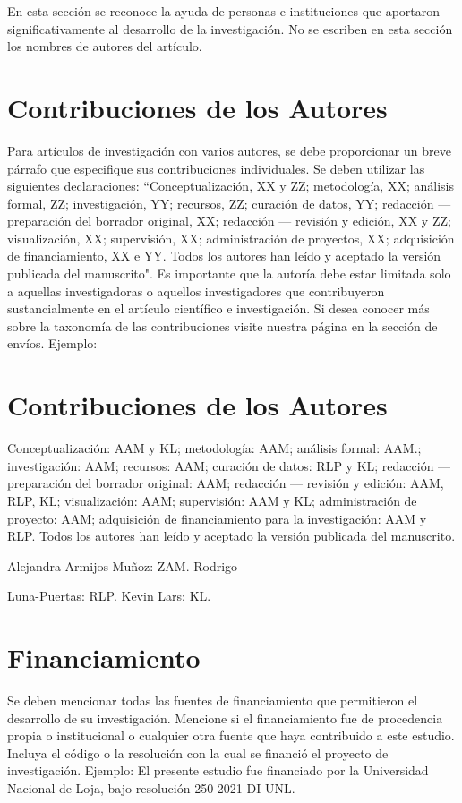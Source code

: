 \documentclass[esp]{CEDAMAZ-class}
\begin{document}
En esta sección se reconoce la ayuda de personas e instituciones que aportaron significativamente al desarrollo de la investigación. No se escriben en esta sección los nombres de autores del artículo.

\section{Contribuciones de los Autores}
Para artículos de investigación con varios autores, se debe proporcionar un breve párrafo que especifique sus contribuciones individuales. Se deben utilizar las siguientes declaraciones: “Conceptualización, XX y ZZ; metodología, XX; análisis formal, ZZ; investigación, YY; recursos, ZZ; curación de datos, YY; redacción — preparación del borrador original, XX; redacción — revisión y edición, XX y ZZ; visualización, XX; supervisión, XX; administración de proyectos, XX; adquisición de financiamiento, XX e YY. Todos los autores han leído y aceptado la versión publicada del manuscrito". Es importante que la autoría debe estar limitada solo a aquellas investigadoras o aquellos investigadores que contribuyeron sustancialmente en el artículo científico e investigación. Si desea conocer más sobre la taxonomía de las contribuciones visite nuestra página en la sección de envíos. Ejemplo: 

\section{Contribuciones de los Autores}
 
Conceptualización: AAM y KL; metodología: AAM; análisis formal: AAM.; investigación: AAM; recursos: AAM; curación de datos: RLP y KL; redacción — preparación del borrador original: AAM; redacción — revisión y edición: AAM, RLP, KL; visualización: AAM; supervisión: AAM y KL; administración de proyecto: AAM; adquisición de financiamiento para la investigación: AAM y RLP. Todos los autores han leído y aceptado la versión publicada del manuscrito. 

Alejandra Armijos-Muñoz: ZAM. Rodrigo

Luna-Puertas: RLP. Kevin Lars: KL. 


\section{Financiamiento}

Se deben mencionar todas las fuentes de financiamiento que permitieron el desarrollo de su investigación. Mencione si el financiamiento fue de procedencia propia o institucional o cualquier otra fuente que haya contribuido a este estudio. Incluya el código o la resolución con la cual se financió el proyecto de investigación. 
Ejemplo: El presente estudio fue financiado por la Universidad Nacional de Loja, bajo resolución 250-2021-DI-UNL. 
\end{document}

